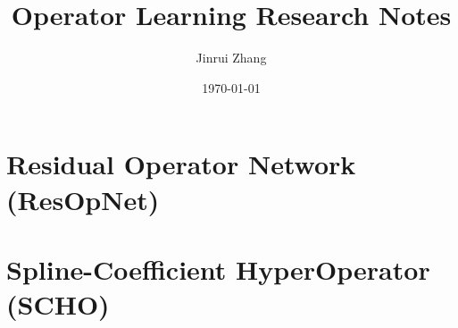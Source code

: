 \documentclass{book}
\title{Operator Learning Research Notes}
\author{Jinrui Zhang}
\date{\today}
\begin{document}
\maketitle
\tableofcontents
\chapter{Residual Operator Network (ResOpNet)}

\chapter{Spline-Coefficient HyperOperator (SCHO)}

\end{document}
